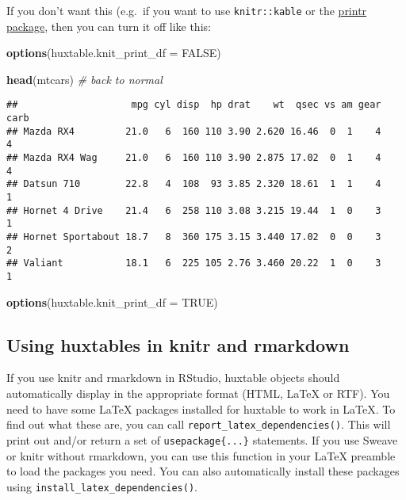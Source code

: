 \documentclass[]{article}
\newenvironment{Shaded}{\begin{snugshade}}{\end{snugshade}}
\newcommand{\KeywordTok}[1]{\textcolor[rgb]{0.13,0.29,0.53}{\textbf{#1}}}
\newcommand{\DataTypeTok}[1]{\textcolor[rgb]{0.13,0.29,0.53}{#1}}
\newcommand{\CommentTok}[1]{\textcolor[rgb]{0.56,0.35,0.01}{\textit{#1}}}
\newcommand{\OtherTok}[1]{\textcolor[rgb]{0.56,0.35,0.01}{#1}}
\newcommand{\NormalTok}[1]{#1}
\begin{document}
\FloatBarrier

If you don't want this (e.g.~if you want to use \texttt{knitr::kable} or
the
\href{https://cran.r-project.org/package=printr/vignettes/printr.html}{printr
package}, then you can turn it off like this:

\begin{Shaded}
\begin{Highlighting}[]
\KeywordTok{options}\NormalTok{(}\DataTypeTok{huxtable.knit_print_df =} \OtherTok{FALSE}\NormalTok{)}

\KeywordTok{head}\NormalTok{(mtcars) }\CommentTok{# back to normal}
\end{Highlighting}
\end{Shaded}

\begin{verbatim}
##                    mpg cyl disp  hp drat    wt  qsec vs am gear carb
## Mazda RX4         21.0   6  160 110 3.90 2.620 16.46  0  1    4    4
## Mazda RX4 Wag     21.0   6  160 110 3.90 2.875 17.02  0  1    4    4
## Datsun 710        22.8   4  108  93 3.85 2.320 18.61  1  1    4    1
## Hornet 4 Drive    21.4   6  258 110 3.08 3.215 19.44  1  0    3    1
## Hornet Sportabout 18.7   8  360 175 3.15 3.440 17.02  0  0    3    2
## Valiant           18.1   6  225 105 2.76 3.460 20.22  1  0    3    1
\end{verbatim}

\begin{Shaded}
\begin{Highlighting}[]
\KeywordTok{options}\NormalTok{(}\DataTypeTok{huxtable.knit_print_df =} \OtherTok{TRUE}\NormalTok{)}
\end{Highlighting}
\end{Shaded}

\FloatBarrier

\subsection{Using huxtables in knitr and
rmarkdown}\label{using-huxtables-in-knitr-and-rmarkdown}

If you use knitr and rmarkdown in RStudio, huxtable objects should
automatically display in the appropriate format (HTML, LaTeX or RTF).
You need to have some LaTeX packages installed for huxtable to work in
LaTeX. To find out what these are, you can call
\texttt{report\_latex\_dependencies()}. This will print out and/or
return a set of \texttt{usepackage\{...\}} statements. If you use Sweave
or knitr without rmarkdown, you can use this function in your LaTeX
preamble to load the packages you need. You can also automatically
install these packages using \texttt{install\_latex\_dependencies()}.
\end{document}
